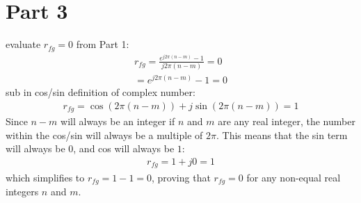 \documentclass[12 pt]{article}
\begin{document}
\section*{Part 3}
evaluate $r_{fg}=0$ from Part 1:
\begin{align*}
    r_{fg}=\frac{e^{j2\pi (n-m)}-1}{j2\pi (n-m)}=0 \\
    =e^{j2\pi(n-m)}-1=0
\end{align*}
sub in cos/sin definition of complex number:
\begin{align*}
    r_{fg}=\cos{(2\pi(n-m))}+j\sin{(2\pi(n-m))}=1
\end{align*}
Since $n-m$ will always be an integer if $n$ and $m$ are any real integer, the number within the cos/sin will always be
a multiple of $2\pi$. This means that the sin term will always be $0$, and cos will always be $1$:
\begin{align*}
    r_{fg}=1+j0=1
\end{align*}
which simplifies to $r_{fg}=1-1=0$, proving that $r_{fg}=0$ for any non-equal real integers $n$ and $m$.
\end{document}
